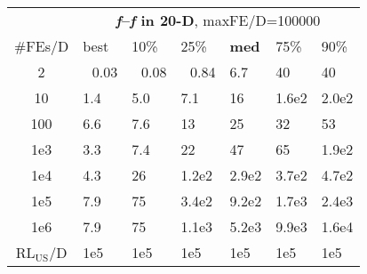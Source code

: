 \begin{tabular}{c|llllll}
 & \multicolumn{6}{|c}{\textbf{\textit{f}\raisebox{-0.35ex}{1}--\textit{f}\raisebox{-0.35ex}{24} in 20-D}, maxFE/D=100000}\\
\#FEs/D & best & 10\% & 25\% & \textbf{med} & 75\% & 90\%\\
2 & ~\,0.03 & ~\,0.08 & ~\,0.84 & \hspace*{1ex}6.7 & 40 & 40\\
10 & \hspace*{1ex}1.4 & \hspace*{1ex}5.0 & \hspace*{1ex}7.1 & 16 & 1.6e2 & 2.0e2\\
100 & \hspace*{1ex}6.6 & \hspace*{1ex}7.6 & 13 & 25 & 32 & 53\\
1e3 & \hspace*{1ex}3.3 & \hspace*{1ex}7.4 & 22 & 47 & 65 & 1.9e2\\
1e4 & \hspace*{1ex}4.3 & 26 & 1.2e2 & 2.9e2 & 3.7e2 & 4.7e2\\
1e5 & \hspace*{1ex}7.9 & 75 & 3.4e2 & 9.2e2 & 1.7e3 & 2.4e3\\
1e6 & \hspace*{1ex}7.9 & 75 & 1.1e3 & 5.2e3 & 9.9e3 & 1.6e4\\
$\text{RL}_{\text{US}}$/D & 1e5 & 1e5 & 1e5 & 1e5 & 1e5 & 1e5
\end{tabular}
